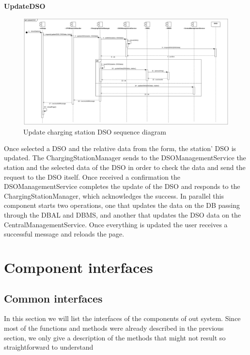 \clearpage
\textbf{UpdateDSO}\\
\begin{figure}[H]
    \centering
    \includegraphics[width=1\textwidth]{Images/cp2/runtime/UpdateDSO.png}
    \caption{Update charging station DSO sequence diagram}
\end{figure}
Once selected a DSO and the relative data from the form, the station' DSO is updated. The ChargingStationManager sends to the DSOManagementService the station and the selected data of the DSO in order to check the data and send the request to the DSO itself. Once received a confirmation the DSOManagementService completes the update of the DSO and responds to the ChargingStationManager, which acknowledges the success. In parallel this component starts two operations, one that updates the data on the DB passing through the DBAL and DBMS, and another that updates the DSO data on the CentralManagementService. Once everything is updated the user receives a successful message and reloads the page. 

\clearpage
\section{Component interfaces}

\subsection{Common interfaces}
In this section we will list the interfaces of the components of out system. Since most of the functions and methods were already described in the previous section, we only give a description of the methods that might not result so straightforward to understand
